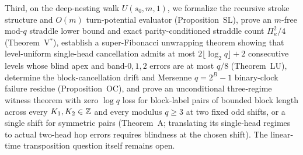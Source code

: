 Third, on the deep-nesting walk $U(s_0, m, 1)$, we formalize the recursive stroke structure and $O(m)$ turn-potential
evaluator (Proposition~SL), prove an $m$-free mod-$q$ straddle lower bound and exact parity-conditioned straddle count
$\Pi_\kappa^2 / 4$ (Theorem~V$^*$), establish a super-Fibonacci unwrapping theorem showing that level-uniform single-head
cancellation admits at most $2\lfloor \log_2 q \rfloor + 2$ consecutive levels whose blind apex and band-$0,1,2$ errors are
at most $q/8$ (Theorem~LU), determine the block-cancellation drift and Mersenne $q = 2^B - 1$ binary-clock failure residue
(Proposition~OC), and prove an unconditional three-regime witness theorem with zero $\log q$ loss for block-label pairs of
bounded block length across every $K_1, K_2 \in \mathbb{Z}$ and every modulus $q \ge 3$ at two fixed odd shifts, or a single shift
for symmetric pairs (Theorem~A; translating its single-head regimes to actual two-head hop errors requires blindness at the
chosen shift). The linear-time transposition question itself remains open.
